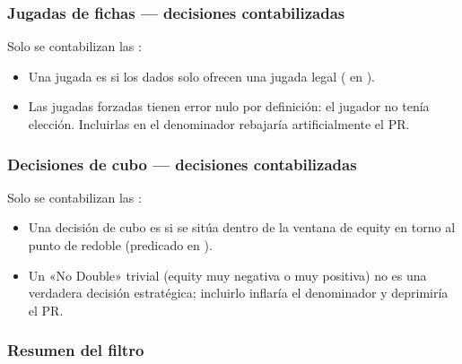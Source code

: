 \documentclass[letterpaper,10pt,spanish]{sphinxmanual}
\begin{document}
\subsubsection{Jugadas de fichas — decisiones contabilizadas}
\label{\detokenize{stats_parity:coups-de-pions-decisions-comptees}}
\sphinxAtStartPar
Solo se contabilizan las :
\begin{itemize}
\item {} 
\sphinxAtStartPar
Una jugada es  si los dados solo ofrecen una jugada legal ( en ).

\item {} 
\sphinxAtStartPar
Las jugadas forzadas tienen error nulo por definición: el jugador no tenía elección. Incluirlas en el denominador rebajaría artificialmente el PR.

\end{itemize}


\subsubsection{Decisiones de cubo — decisiones contabilizadas}
\label{\detokenize{stats_parity:decisions-de-cube-decisions-comptees}}
\sphinxAtStartPar
Solo se contabilizan las :
\begin{itemize}
\item {} 
\sphinxAtStartPar
Una decisión de cubo es  si se sitúa dentro de la ventana de equity \sphinxcode{\sphinxupquote{{[}\sphinxhyphen{}0.16, +0.16{]}}} en torno al punto de redoble (predicado  en ).

\item {} 
\sphinxAtStartPar
Un «No Double» trivial (equity muy negativa o muy positiva) no es una verdadera decisión estratégica; incluirlo inflaría el denominador y deprimiría el PR.

\end{itemize}


\subsubsection{Resumen del filtro}
\label{\detokenize{stats_parity:resume-du-filtre}}
\end{document}
